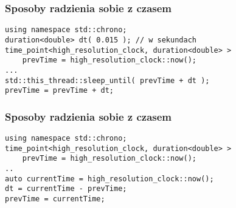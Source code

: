 \documentclass{beamer}
\begin{document}
\begin{frame}[fragile]
	\frametitle{Sposoby radzienia sobie z czasem}
\begin{verbatim}
using namespace std::chrono;
duration<double> dt( 0.015 ); // w sekundach
time_point<high_resolution_clock, duration<double> >
    prevTime = high_resolution_clock::now();
...
std::this_thread::sleep_until( prevTime + dt );
prevTime = prevTime + dt;
\end{verbatim}
	\EB
\end{frame}


\begin{frame}[fragile]
	\frametitle{Sposoby radzienia sobie z czasem}
\begin{verbatim}
using namespace std::chrono;
time_point<high_resolution_clock, duration<double> > 
    prevTime = high_resolution_clock::now();
..
auto currentTime = high_resolution_clock::now();
dt = currentTime - prevTime;
prevTime = currentTime;
\end{verbatim}
	\EB
\end{frame}
\end{document}
